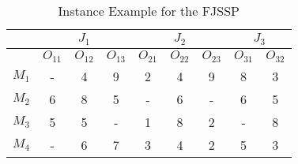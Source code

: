 
\begin{table}[tb]
\scriptsize
   \centering
   \caption{Instance Example for the FJSSP}
   \label{tab:proccesingTime}%
\begin{tabular}{c|ccc|ccc|cc}
\hline
\multicolumn{1}{l|}{} & \multicolumn{3}{c}{$J_1$} & \multicolumn{3}{c}{$J_2$} & \multicolumn{2}{c}{$J_3$} \\
\hline
\multicolumn{1}{l|}{} & $O_{11}$    & $O_{12}$   & $O_{13}$   & $O_{21}$    & $O_{22}$   & $O_{23}$   & $O_{31}$        & $O_{32}$       \\
\hline
$M_1$                   & -      & 4     & 9     & 2      & 4     & 9     & 8          & 3         \\
$M_2$                   & 6      & 8     & 5     & -      & 6     & -     & 6          & 5         \\
$M_3$                   & 5      & 5     & -     & 1      & 8     & 2     & -          & 8         \\
$M_4$                   & -      & 6     & 7     & 3      & 4     & 2     & 5          & 3        \\
\hline
\end{tabular}
\end{table}
